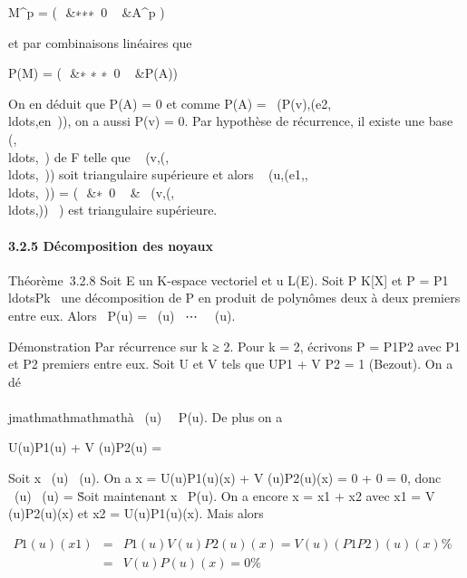 M^p = \left
(\matrix\,\lambda~&∗∗∗ \cr
\matrix\,0 \cr
\⋮~ &A^p \right )

et par combinaisons linéaires que

P(M) = \left
(\matrix\,\lambda~&∗ ∗ ∗ \cr
\matrix\,0 \cr
\⋮~ &P(A)\right )

On en déduit que P(A) = 0 et comme P(A) =\
\mathrmMat
(P(v),(e2,\\ldots,en~)),
on a aussi P(v) = 0. Par hypothèse de récurrence, il existe une base
(\epsilon2,\\ldots,\epsilonn~)
de F telle que \mathrmMat~
(v,(,\\ldots,\epsilonn~))
soit triangulaire supérieure et alors
\mathrmMat~
(u,(e1,,\\ldots,\epsilonn~))
= \left (\matrix\,\lambda~&∗
\cr \matrix\,0
\cr \⋮~
&\mathrmMat~
(v,(,\\ldots,\epsilonn))~\right
) est triangulaire supérieure.

\paragraph{3.2.5 Décomposition des noyaux}

Théorème~3.2.8 Soit E un K-espace vectoriel et u \in L(E). Soit P \in
K{[}X{]} et P =
P1\\ldotsPk~
une décomposition de P en produit de polynômes deux à deux premiers
entre eux. Alors
\mathrmKer~P(u)
= ~(u)
\oplus~⋯
\oplus~\mathrmKerPk~(u).

Démonstration Par récurrence sur k ≥ 2. Pour k = 2, écrivons P =
P1P2 avec P1 et P2 premiers
entre eux. Soit U et V tels que UP1 + V P2 = 1
(Bezout). On a dé\\\\jmathmathmathmathà
\mathrmKerPi~(u)
\subset~\mathrmKer~P(u). De plus on
a

U(u)P1(u) + V (u)P2(u) =
\mathrmIdE

Soit x
\in{}~(u)
\bigcap{}~(u).
On a x = U(u)P1(u)(x) + V (u)P2(u)(x) = 0 + 0 = 0,
donc
~(u)
\bigcap{}~(u)
= \0\. Soit maintenant x
\in\mathrmKer~P(u). On a
encore x = x1 + x2 avec x1 = V
(u)P2(u)(x) et x2 = U(u)P1(u)(x). Mais
alors

\begin{align*} P1(u)(x1)& =&
P1(u)V (u)P2(u)(x) = V
(u)(P1P2)(u)(x)\%& \\
& =& V (u)P(u)(x) = 0 \%& \\
\end{align*}

